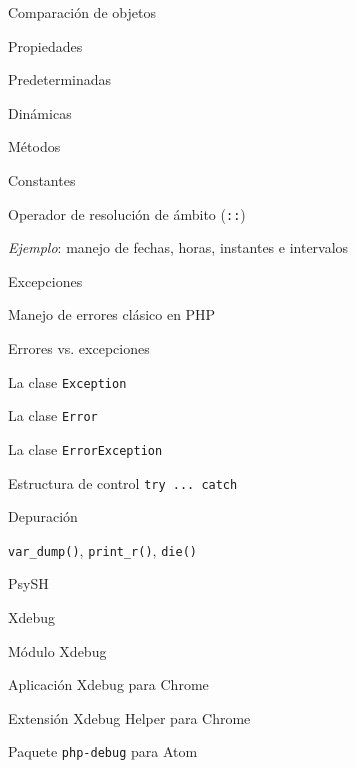 \begin{longenum}
\begin{longenum}
\begin{longenum}
            \item Comparación de objetos
            \item Propiedades
            \begin{longenum}
                \item Predeterminadas
                \item Dinámicas
            \end{longenum}
            \item Métodos
            \item Constantes
            \begin{longenum}
                \item Operador de resolución de ámbito (\texttt{::})
            \end{longenum}
            \item \textit{Ejemplo}: manejo de fechas, horas, instantes e intervalos
        \end{longenum}
        \item Excepciones
        \begin{longenum}
            \item Manejo de errores clásico en PHP
            \item Errores vs. excepciones
            \item La clase \texttt{Exception}
            \item La clase \texttt{Error}
            \item La clase \texttt{ErrorException}
            \item Estructura de control \texttt{try ... catch}
        \end{longenum}
        \item Depuración
        \begin{longenum}
            \item \texttt{var\_dump()}, \texttt{print\_r()}, \texttt{die()}
            \item PsySH
            \item Xdebug \opcional\
            \begin{longenum}
                \item Módulo Xdebug
                \item Aplicación Xdebug para Chrome
                \item Extensión Xdebug Helper para Chrome
                \item Paquete \texttt{php-debug} para Atom
            \end{longenum}

\end{longenum}
\end{longenum}
\end{longenum}
